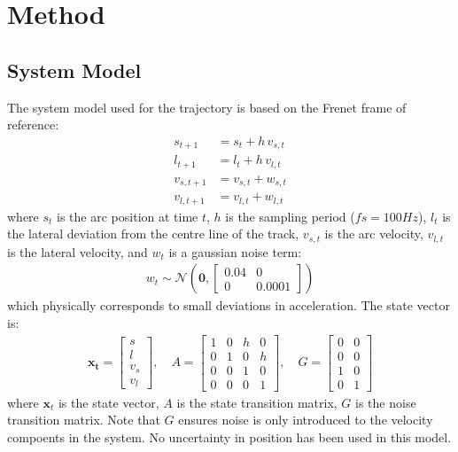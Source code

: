 \section{Method}
\label{sec:method}

\subsection{System Model}

The system model used for the trajectory is based on the Frenet frame of reference\cite{fjp_2025_github}:
\begin{equation}
\label{eq:sys-eqs}
    \begin{aligned}
        s_{t+1} &= s_t + h \, v_{s,t} \\
        l_{t+1} &= l_t + h \, v_{l,t} \\
        v_{s,t+1} &= v_{s,t} + w_{s,t} \\
        v_{l,t+1} &= v_{l,t} + w_{l,t}
    \end{aligned}
\end{equation}
where $s_t$ is the arc position at time $t$, $h$ is the sampling period ($fs = 100Hz$), $l_t$ is the lateral deviation from the centre line of the track, $v_{s, t}$ is the arc velocity, $v_{l,t}$ is the lateral velocity, and $w_t$ is a gaussian noise term:
\begin{align}
\label{eq:noise}
    w_t \sim \mathcal{N}\left(\mathbf{0}, \begin{bmatrix} 0.04 & 0 \\ 0 & 0.0001 \end{bmatrix}\right)
\end{align}
which physically corresponds to small deviations in acceleration. The state vector is:
\begin{align}
\label{eq:state-vec}
    \mathbf{x_t} = \begin{bmatrix}s \\ l \\ v_s \\ v_l \end{bmatrix}, \quad
    A = \begin{bmatrix}1 & 0 & h & 0 \\ 0 & 1 & 0 & h \\ 0 & 0 & 1 & 0 \\ 0 & 0 & 0 & 1 \end{bmatrix}, \quad
    G = \begin{bmatrix}0 & 0 \\ 0 & 0 \\ 1 & 0 \\ 0 & 1 \end{bmatrix}
\end{align}
where $\mathbf{x}_{t}$ is the state vector, $A$ is the state transition matrix, $G$ is the noise transition matrix. Note that $G$ ensures noise is only introduced to the velocity compoents in the system. No uncertainty in position has been used in this model.

